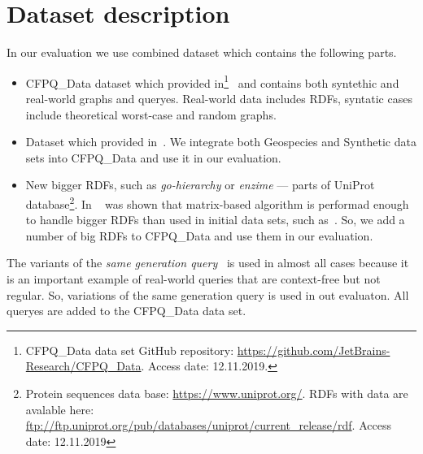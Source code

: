 \section{Dataset description}

In our evaluation we use combined dataset which contains the following parts.
\begin{itemize}
\item CFPQ\_Data dataset which provided in\footnote{CFPQ\_Data data set GitHub repository: \url{https://github.com/JetBrains-Research/CFPQ_Data}. Access date: 12.11.2019.}~\cite{Mishin:2019:ECP:3327964.3328503} and contains both syntethic and real-world graphs and queryes.
Real-world data includes RDFs, syntatic cases include theoretical worst-case and random graphs.
\item Dataset which provided in~\cite{Kuijpers:2019:ESC:3335783.3335791}. We integrate both Geospecies and Synthetic data sets into CFPQ\_Data and use it in our evaluation.
\item New bigger RDFs, such as \textit{go-hierarchy} or \textit{enzime} --- parts of UniProt database\footnote{Protein sequences data base: \url{https://www.uniprot.org/}. RDFs with data are avalable here: \url{ftp://ftp.uniprot.org/pub/databases/uniprot/current_release/rdf}. Access date: 12.11.2019}.
In ~\cite{Mishin:2019:ECP:3327964.3328503} was shown that matrix-based algorithm is performad enough to handle bigger RDFs than used in initial data sets, such as~\cite{RDF}.
So, we add a number of big RDFs to CFPQ\_Data and use them in our evaluation.
\end{itemize}

The variants of the \textit{same generation query}~\cite{FndDB} is used in almost all cases because it is an important example of real-world queries that are context-free but not regular.
So, variations of the same generation query is used in out evaluaton.
All queryes are added to the CFPQ\_Data data set.

